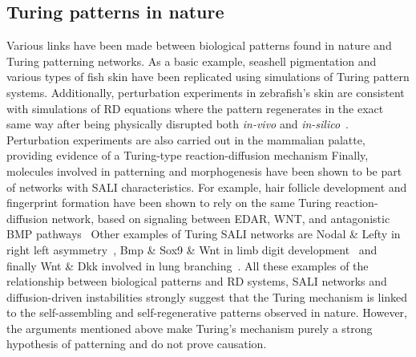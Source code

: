 
\subsection{Turing patterns in nature}\label{Turing patterns in nature}
Various links have been made between biological patterns found in nature and Turing patterning networks.
As a basic example, seashell pigmentation and various types of fish skin have been replicated using simulations of Turing pattern systems.
Additionally, perturbation experiments in zebrafish’s skin are consistent with simulations of RD equations where the pattern regenerates in the exact same way after being physically disrupted both \textit{in-vivo} and \textit{in-silico}~\parencite{Kondo2010a}.
Perturbation experiments are also carried out in the mammalian palatte, providing evidence of a Turing-type reaction-diffusion mechanism %
Finally, molecules involved in patterning and morphogenesis have been shown to be part of networks with SALI characteristics.
For example, hair follicle development and fingerprint formation have been shown to rely on the same Turing reaction-diffusion network, based on signaling between EDAR, WNT, and antagonistic BMP pathways~\parencite{Glover2023}
Other examples of Turing SALI networks are Nodal \& Lefty in right left asymmetry~\parencite{Nakamura2006}, Bmp \& Sox9 \& Wnt in limb digit development~\parencite{Raspopovic1} and finally Wnt \& Dkk involved in lung branching~\parencite{langhe2005_lung}.
All these examples of the relationship between biological patterns and RD systems, SALI networks and diffusion-driven instabilities strongly suggest that the Turing mechanism is linked to the self-assembling and self-regenerative patterns observed in nature.
However, the arguments mentioned above make Turing’s mechanism purely a strong hypothesis of patterning and do not prove causation.


